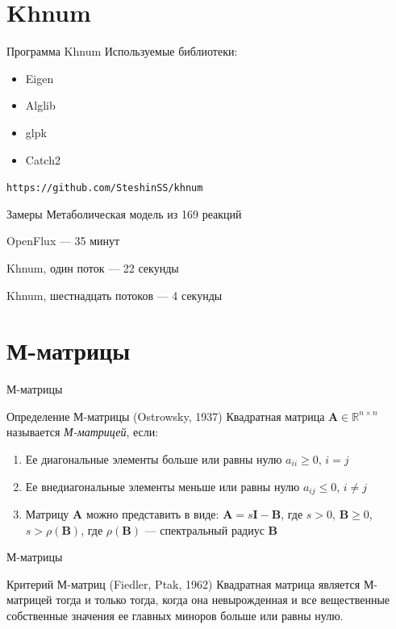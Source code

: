 \documentclass[aspectratio=169]{beamer}
\begin{document}
\section{Khnum}
\begin{frame}{Программа Khnum}
Используемые библиотеки:
\begin{itemize}
	\item Eigen
	\item Alglib
	\item glpk
	\item Catch2
\end{itemize}

\texttt{https://github.com/SteshinSS/khnum}
\end{frame}

\begin{frame}{Замеры}
Метаболическая модель из 169 реакций

OpenFlux --- 35 минут

Khnum, один поток --- 22 секунды

Khnum, шестнадцать потоков --- 4 секунды
\end{frame}

\section{М-матрицы}
\begin{frame}{М-матрицы}
\begin{block}{Определение М-матрицы (Ostrowsky, 1937)}
	Квадратная матрица $\mathbf{A} \in \mathbb{R}^{n \times n}$ называется \emph{М-матрицей}, если:
	\begin{enumerate}
		\item Ее диагональные элементы больше или равны нулю $a_{ii} \ge 0$, $i = j$
		\item Ее внедиагональные элементы меньше или равны нулю $a_{ij} \le 0$, $i \neq j$
		\item Матрицу $\mathbf{A}$ можно представить в виде: $\mathbf{A} = s\mathbf{I} - \mathbf{B}$, где $s > 0$, $\mathbf{B} \ge 0$, $s > \rho(\mathbf{B})$, где $\rho(\mathbf{B})$ --- спектральный радиус $\mathbf{B}$
	\end{enumerate}
\end{block}

\end{frame}

\begin{frame}{М-матрицы}
\begin{block}{Критерий М-матриц (Fiedler, Ptak, 1962)}
	Квадратная матрица является М-матрицей тогда и только тогда, когда она невырожденная и все вещественные собственные значения ее главных миноров больше или равны нулю. 
\end{block}
\end{frame}
\end{document}
